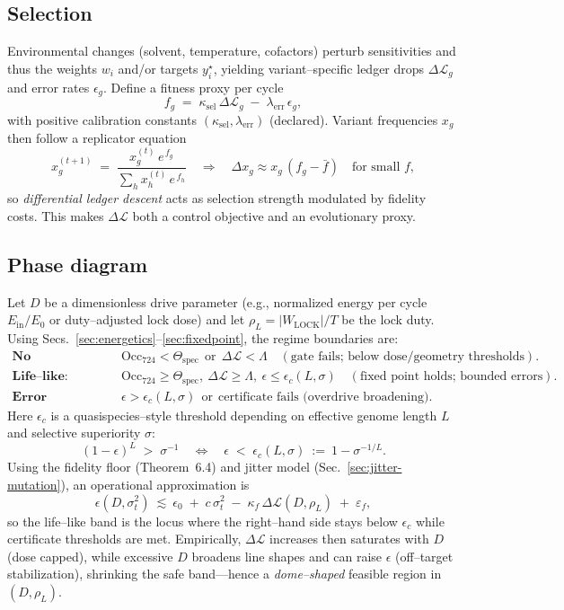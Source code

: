 \documentclass[11pt]{article}
\begin{document}
\subsection{Selection}\label{sec:selection}
Environmental changes (solvent, temperature, cofactors) perturb sensitivities and thus the weights $w_i$ and/or targets $y_i^\star$, yielding variant–specific ledger drops $\Delta\mathcal{L}_g$ and error rates $\epsilon_g$. Define a fitness proxy per cycle
\[
f_g\;=\;\kappa_{\mathrm{sel}}\,\Delta\mathcal{L}_g\;-\;\lambda_{\mathrm{err}}\,\epsilon_g,
\]
with positive calibration constants $(\kappa_{\mathrm{sel}},\lambda_{\mathrm{err}})$ (declared). Variant frequencies $x_g$ then follow a replicator equation
\[
x_g^{(t+1)}\;=\;\frac{x_g^{(t)}\,e^{\,f_g}}{\sum_h x_h^{(t)}\,e^{\,f_h}}
\quad\Longrightarrow\quad
\Delta x_g \approx x_g\,(f_g-\bar f)\quad\text{for small }f,
\]
so \emph{differential ledger descent} acts as selection strength modulated by fidelity costs. This makes $\Delta\mathcal{L}$ both a control objective and an evolutionary proxy.

\subsection{Phase diagram}\label{sec:phasediagram}
Let $D$ be a dimensionless drive parameter (e.g., normalized energy per cycle $E_{\mathrm{in}}/E_0$ or duty–adjusted lock dose) and let $\rho_L=|W_{\mathrm{LOCK}}|/T$ be the lock duty. Using Secs.~\ref{sec:energetics}–\ref{sec:fixedpoint}, the regime boundaries are:
\begin{align*}
\textbf{No replication:}&\quad \mathrm{Occ}_{724}<\Theta_{\mathrm{spec}}\ \ \text{or}\ \ \Delta\mathcal{L}<\Lambda
\quad(\text{gate fails; below dose/geometry thresholds}).\\[2pt]
\textbf{Life–like:}&\quad \mathrm{Occ}_{724}\ge\Theta_{\mathrm{spec}},\ \Delta\mathcal{L}\ge\Lambda,\ \epsilon\le \epsilon_c(L,\sigma)
\quad(\text{fixed point holds; bounded errors}).\\[2pt]
\textbf{Error catastrophe:}&\quad \epsilon>\epsilon_c(L,\sigma)\ \ \text{or}\ \ \text{certificate fails (overdrive broadening)}.
\end{align*}
Here $\epsilon_c$ is a quasispecies–style threshold depending on effective genome length $L$ and selective superiority $\sigma$:
\[
(1-\epsilon)^L\;>\;\sigma^{-1}\quad\Longleftrightarrow\quad
\epsilon\;<\;\epsilon_c(L,\sigma)\ :=\ 1-\sigma^{-1/L}.
\]
Using the fidelity floor (Theorem~6.4) and jitter model (Sec.~\ref{sec:jitter-mutation}), an operational approximation is
\[
\epsilon(D,\sigma_t^2)\ \lesssim\ \epsilon_0\;+\;c\,\sigma_t^2\;-\;\kappa_f\,\Delta\mathcal{L}(D,\rho_L)\;+\;\varepsilon_f,
\]
so the life–like band is the locus where the right–hand side stays below $\epsilon_c$ while certificate thresholds are met. Empirically, $\Delta\mathcal{L}$ increases then saturates with $D$ (dose capped), while excessive $D$ broadens line shapes and can raise $\epsilon$ (off–target stabilization), shrinking the safe band—hence a \emph{dome–shaped} feasible region in $(D,\rho_L)$.
\end{document}
